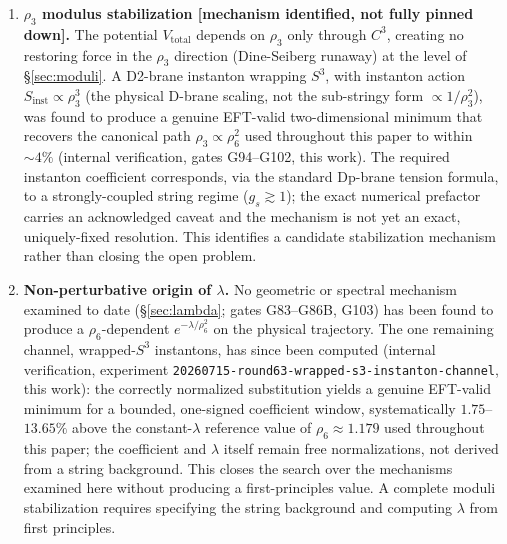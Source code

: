 \documentclass[12pt,a4paper]{article}
\begin{document}
\begin{enumerate}
\item \textbf{$\rho_3$ modulus stabilization [mechanism identified, not fully pinned down].}
  The potential $V_{\mathrm{total}}$ depends on $\rho_3$ only through $C^3$, creating no
  restoring force in the $\rho_3$ direction (Dine-Seiberg runaway) at the level of
  \S\ref{sec:moduli}. A D2-brane instanton wrapping $S^3$, with instanton action
  $S_{\mathrm{inst}}\propto\rho_3^3$ (the physical D-brane scaling, not the
  sub-stringy form $\propto 1/\rho_3^2$), was found to produce a genuine EFT-valid
  two-dimensional minimum that recovers the canonical path $\rho_3\propto\rho_6^2$ used
  throughout this paper to within $\sim\!4\%$ (internal verification, gates G94--G102,
  this work). The required instanton coefficient corresponds, via the standard Dp-brane
  tension formula, to a strongly-coupled string regime ($g_s\gtrsim 1$); the exact
  numerical prefactor carries an acknowledged caveat and the mechanism is not yet an
  exact, uniquely-fixed resolution. This identifies a candidate stabilization mechanism
  rather than closing the open problem.

\item \textbf{Non-perturbative origin of $\lambda$.} No geometric or spectral mechanism
  examined to date (\S\ref{sec:lambda}; gates G83--G86B, G103) has been found to produce
  a $\rho_6$-dependent $e^{-\lambda/\rho_6^2}$ on the physical trajectory. The one remaining
  channel, wrapped-$S^3$ instantons, has since been computed (internal verification,
  experiment \texttt{20260715-round63-wrapped-s3-instanton-channel}, this work): the
  correctly normalized substitution yields a genuine EFT-valid minimum for a bounded,
  one-signed coefficient window, systematically $1.75$--$13.65\%$ above the constant-$\lambda$
  reference value of $\rho_6\approx 1.179$ used throughout this paper; the coefficient and
  $\lambda$ itself remain free normalizations, not derived from a string background. This
  closes the search over the mechanisms examined here without producing a first-principles
  value. A complete moduli stabilization requires specifying the string background and
  computing $\lambda$ from first principles.


\end{enumerate}
\end{document}

